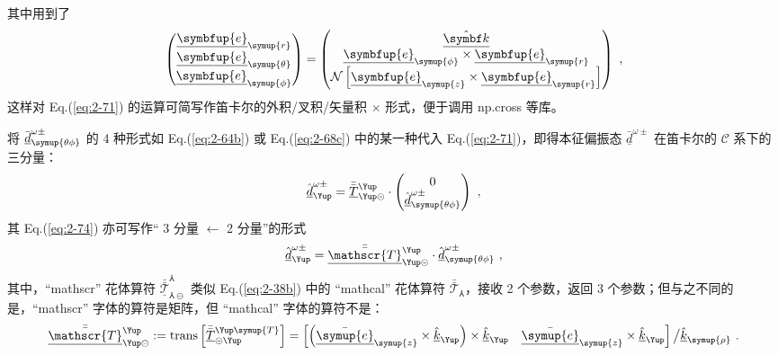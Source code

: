 其中用到了
\begin{equation} \label{eq:2-73}
	\begin{pmatrix} \underline{\symbfup{e}}_{{\symup{r}}} \\ \underline{\symbfup{e}}_{{\symup{\theta}}} \\ \underline{\symbfup{e}}_{{\symup{\phi}}} \end{pmatrix} = \begin{pmatrix} \hat{\underline{\symbf k}} \\ \underline{\symbfup{e}}_{{\symup{\phi}}} \times \underline{\symbfup{e}}_{{\symup{r}}} \\ \mathcal{N} \left[ \underline{\symbfup{e}}_{{\symup{z}}} \times \underline{\symbfup{e}}_{{\symup{r}}} \right] \end{pmatrix} ~,
\end{equation}
这样对 Eq.(\ref{eq:2-71}) 的运算可简写作笛卡尔的外积/叉积/矢量积 $\times$ 形式，便于调用 np.cross 等库。

将 $\bar{\underline{d}}^{\omega\pm}_{\symup{\theta\phi}}$ 的 4 种形式如 Eq.(\ref{eq:2-64b}) 或 Eq.(\ref{eq:2-68c}) 中的某一种代入 Eq.(\ref{eq:2-71})，即得本征偏振态 $\bar{\underline{d}}^{\omega\pm}$ 在笛卡尔的 $\mathcal{C}$ 系下的三分量：
\begin{equation} \label{eq:2-74}
	\abovedisplayskip=16pt
	\belowdisplayskip=16pt
	\hat{\underline{d}}^{\omega\pm}_{\Yup} = \bar{\bar{\underline{T}}}^{\Yup}_{\Yup\circleddash} \cdot \begin{pmatrix} 0 \\ \hat{\underline{d}}^{\omega\pm}_{\symup{\theta\phi}} \end{pmatrix} ~,
\end{equation}
其 Eq.(\ref{eq:2-74}) 亦可写作“ 3 分量 $\leftarrow$ 2 分量”的形式
\begin{equation} \label{eq:2-75}
	\abovedisplayskip=16pt
	\belowdisplayskip=16pt
	\hat{\underline{d}}^{\omega\pm}_{\Yup} = \bar{\bar{\underline{\mathscr{T}}}}^{\Yup}_{\Yup\circleddash} \cdot \hat{\underline{d}}^{\omega\pm}_{\symup{\theta\phi}} ~,
\end{equation}
其中，“mathscr” 花体算符 $\bar{\bar{\underline{\mathscr{T}}}}^{\Yup}_{\Yup\circleddash}$ 类似 Eq.(\ref{eq:2-38b}) 中的 “mathcal” 花体算符 $\bar{\bar{\mathcal{T}}}_{\Yup}$，接收 2 个参数，返回 3 个参数；但与之不同的是，“mathscr” 字体的算符是矩阵，但 “mathcal” 字体的算符不是：
\begin{equation} \label{eq:2-76}
	\abovedisplayskip=16pt
	\belowdisplayskip=16pt
	\bar{\bar{\underline{\mathscr{T}}}}^{\Yup}_{\Yup\circleddash} := \text{trans} \left[ \bar{\bar{\underline{T}}}^{\Yup \symup{T}}_{\circleddash\Yup} \right] = \begin{bmatrix} \left( \bar{\underline{\symup{e}}}_{\symup{z}} \times \hat{\underline{k}}_{\Yup} \right) \times \hat{\underline{k}}_{\Yup} & \bar{\underline{\symup{e}}}_{\symup{z}} \times \hat{\underline{k}}_{\Yup} \end{bmatrix} \big/ \hat{\underline{k}}_{\symup{\rho}} ~.
\end{equation}

